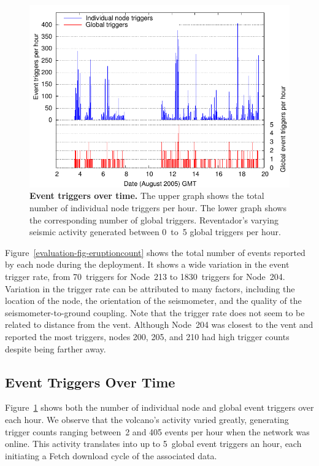 \begin{figure}[t]
\begin{center}
\includegraphics[width=\hsize]{./3-evaluation/figs/eruptionspertime.pdf}
\end{center}
\caption{\textbf{Event triggers over time.}
The upper graph shows the total number of individual node triggers per hour.
The lower graph shows the corresponding number of global triggers.
Reventador's varying seismic activity generated between 0~to~5 global
triggers per hour.}
\label{evaluation-fig-eruptionspertime}
\end{figure}

Figure~\ref{evaluation-fig-eruptioncount} shows the total number of events
reported by each node during the deployment. It shows a wide variation in the
event trigger rate, from 70~triggers for Node~213 to 1830~triggers for
Node~204. Variation in the trigger rate can be attributed to many factors,
including the location of the node, the orientation of the seismometer, and
the quality of the seismometer-to-ground coupling. Note that the trigger rate
does not seem to be related to distance from the vent. Although Node~204 was
closest to the vent and reported the most triggers, nodes 200, 205, and 210
had high trigger counts despite being farther away.

\subsection{Event Triggers Over Time}

Figure~\ref{evaluation-fig-eruptionspertime} shows both the number of individual
node and global event triggers over each hour. We observe that the volcano's
activity varied greatly, generating trigger counts ranging between~2 and 405
events per hour when the network was online. This activity translates into up
to 5~global event triggers an hour, each initiating a Fetch download cycle of
the associated data.

